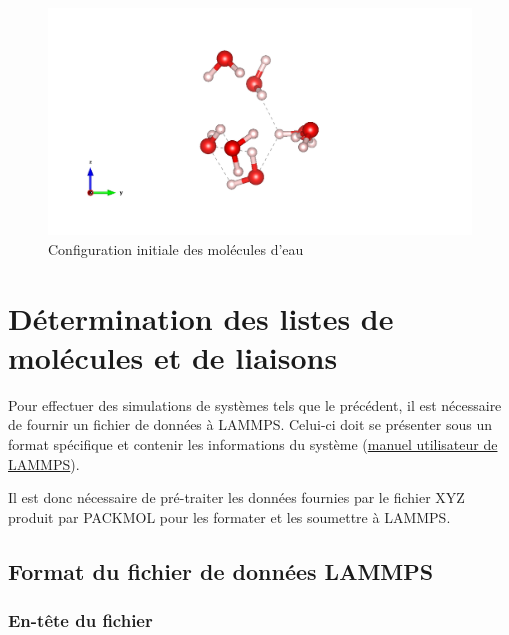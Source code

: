 \documentclass[11pt, a4paper]{article}
\begin{document}
\begin{figure}[hbpt]
	\centering
	\includegraphics[width=\linewidth]{init.png}
	\caption{Configuration initiale des molécules d'eau}
	\label{fig:initiale}
\end{figure}

\clearpage
\section{Détermination des listes de molécules et de liaisons}

Pour effectuer des simulations de systèmes tels que le précédent, il est nécessaire de fournir un fichier de données à LAMMPS. Celui-ci doit se présenter sous un format spécifique et contenir les informations du système (\href{https://docs.lammps.org/read_data.html#format-of-a-data-file}{manuel utilisateur de LAMMPS}).

Il est donc nécessaire de pré-traiter les données fournies par le fichier XYZ produit par PACKMOL pour les formater et les soumettre à LAMMPS.

	\subsection{Format du fichier de données LAMMPS}

		\subsubsection{En-tête du fichier}
\end{document}
